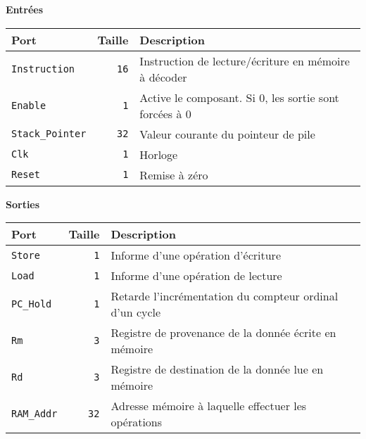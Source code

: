 \documentclass{article}
\begin{document}

    \textbf{Entrées}\\

    \begin{tabular}{|l|r|l|}
        \hline
        \textbf{Port}           & \textbf{Taille} & \textbf{Description}                                 \\
        \hline

        \texttt{Instruction}    & \texttt{16}     & Instruction de lecture/écriture en mémoire à décoder \\
        \hline
        \texttt{Enable} & \texttt{1} & Active le composant.
        Si 0, les sortie sont forcées à 0 \\
        \hline
        \texttt{Stack\_Pointer} & \texttt{32}     & Valeur courante du pointeur de pile                  \\
        \hline
        \texttt{Clk}            & \texttt{1}      & Horloge                                              \\
        \hline
        \texttt{Reset}          & \texttt{1}      & Remise à zéro                                        \\


        \hline
    \end{tabular}

    \vspace{1em}
    \textbf{Sorties}\\

    \begin{tabular}{|l|r|l|}
        \hline
        \textbf{Port}      & \textbf{Taille} & \textbf{Description}                                    \\
        \hline

        \texttt{Store}     & \texttt{1}      & Informe d'une opération d'écriture                      \\
        \hline
        \texttt{Load}      & \texttt{1}      & Informe d'une opération de lecture                      \\
        \hline
        \texttt{PC\_Hold}  & \texttt{1}      & Retarde l'incrémentation du compteur ordinal d'un cycle \\
        \hline
        \texttt{Rm}        & \texttt{3}      & Registre de provenance de la donnée écrite en mémoire   \\
        \hline
        \texttt{Rd}        & \texttt{3}      & Registre de destination de la donnée lue en mémoire     \\
        \hline
        \texttt{RAM\_Addr} & \texttt{32}     & Adresse mémoire à laquelle effectuer les opérations     \\

        \hline
    \end{tabular}
\end{document}
